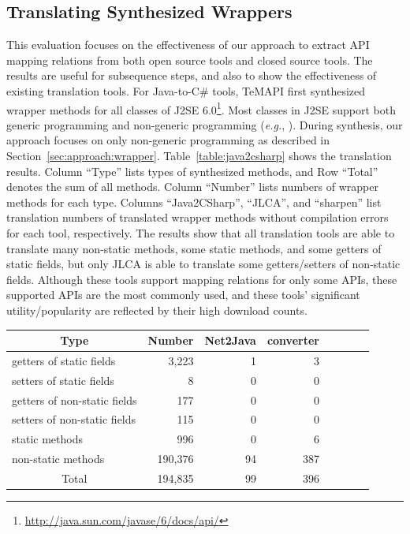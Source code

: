 \subsection{Translating Synthesized Wrappers}
\label{sec:evaluation:element}
This evaluation focuses on the effectiveness of our approach to extract API mapping relations from both open source tools and closed source tools. The results are useful for subsequence steps, and also to show the effectiveness of existing translation tools. For Java-to-C\# tools, TeMAPI first synthesized wrapper methods for all classes of J2SE 6.0\footnote{\url{http://java.sun.com/javase/6/docs/api/}}. Most classes in J2SE support both generic programming and non-generic programming (\emph{e.g.}, ). During synthesis, our approach focuses on only non-generic programming as described in Section~\ref{sec:approach:wrapper}. Table~\ref{table:java2csharp} shows the translation results. Column ``Type'' lists types of synthesized methods, and Row ``Total'' denotes the sum of all methods. Column ``Number'' lists numbers of wrapper methods for each type. Columns ``Java2CSharp'', ``JLCA'', and ``sharpen'' list translation numbers of translated wrapper methods without compilation errors for each tool, respectively. The results show that all translation tools are able to translate many non-static methods, some static methods, and some getters of static fields, but only JLCA is able to translate some getters/setters of non-static fields. Although these tools support mapping relations for only some APIs, these supported APIs are the most commonly used, and these tools' significant utility/popularity are reflected by their high download counts.

\begin{table}[t]
\centering
\begin{SmallOut}
\begin {tabular} {|l|r|r|r|r|r|c|c|}
 \hline
\multicolumn{1}{|c}{\textbf{Type}} & \multicolumn{1}{|c}{\textbf{Number}}
& \multicolumn{1}{|c|}{\textbf{Net2Java}} & \multicolumn{1}{|c|}{\textbf{converter}}\\
\hline
getters of static fields      &  3,223 & 1    &  3     \\
\hline
setters of static fields      &  8    & 0    &  0       \\
\hline
getters of non-static fields  &   177 & 0    &  0    \\
\hline
setters of non-static fields  &   115 & 0    &  0    \\
\hline
static methods                &   996 & 0    &  6  \\
\hline
non-static methods            &190,376& 94    &  387     \\
\hline
\multicolumn{1}{|c|}{Total}   &194,835& 99     &  396 \\
\hline
\end{tabular}%
 \label{table:csharp2java}
\end{SmallOut}\vspace*{-6ex}
\end{table}


